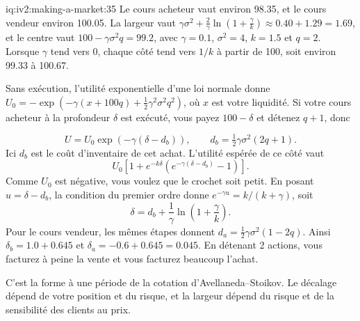 \begin{solution}{iq:iv2:making-a-market:35}
Le cours acheteur vaut environ 98.35, et le cours vendeur environ 100.05. La largeur vaut $\gamma\sigma^2 + \frac{2}{\gamma}\ln\left(1 + \frac{\gamma}{k}\right) \approx 0.40 + 1.29 = 1.69$, et le centre vaut $100 - \gamma\sigma^2 q = 99.2$, avec $\gamma = 0.1$, $\sigma^2 = 4$, $k = 1.5$ et $q = 2$. Lorsque $\gamma$ tend vers 0, chaque côté tend vers $1/k$ à partir de 100, soit environ 99.33 à 100.67.

\begin{sloppypar}Sans exécution, l'utilité exponentielle d'une loi normale donne $U_0 = -\exp\left(-\gamma(x + 100q) + \tfrac12\gamma^2\sigma^2 q^2\right)$, où $x$ est votre liquidité. Si votre cours acheteur à la profondeur $\delta$ est exécuté, vous payez $100 - \delta$ et détenez $q + 1$, donc\end{sloppypar}
\[
U = U_0 \exp\left(-\gamma(\delta - d_b)\right), \qquad d_b = \tfrac12\gamma\sigma^2(2q + 1).
\]
Ici $d_b$ est le coût d'inventaire de cet achat. L'utilité espérée de ce côté vaut
\[
U_0\left[1 + e^{-k\delta}\left(e^{-\gamma(\delta - d_b)} - 1\right)\right].
\]
Comme $U_0$ est négative, vous voulez que le crochet soit petit. En posant $u = \delta - d_b$, la condition du premier ordre donne $e^{-\gamma u} = k/(k + \gamma)$, soit
\[
\delta = d_b + \frac{1}{\gamma}\ln\left(1 + \frac{\gamma}{k}\right).
\]
Pour le cours vendeur, les mêmes étapes donnent $d_a = \tfrac12\gamma\sigma^2(1 - 2q)$. Ainsi $\delta_b = 1.0 + 0.645$ et $\delta_a = -0.6 + 0.645 = 0.045$. En détenant 2 actions, vous facturez à peine la vente et vous facturez beaucoup l'achat.

C'est la forme à une période de la cotation d'Avellaneda--Stoikov. Le décalage dépend de votre position et du risque, et la largeur dépend du risque et de la sensibilité des clients au prix.

\end{solution}
